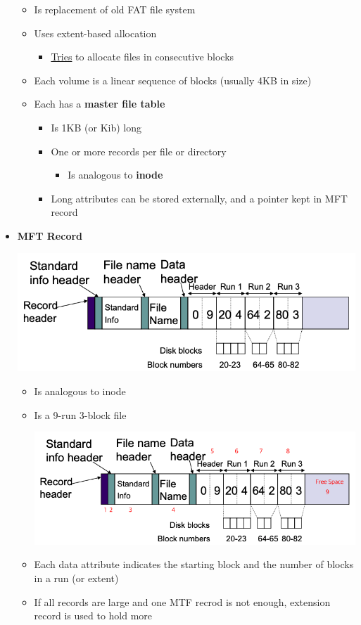 \documentclass[12pt]{article}
\begin{document}
\begin{itemize}
    \begin{itemize}
        \item Is replacement of old FAT file system
        \item Uses extent-based allocation
        \begin{itemize}
            \item \underline{Tries} to allocate files in consecutive blocks
        \end{itemize}
        \item Each volume is a linear sequence of blocks (usually 4KB in size)
        \item Each has a \textbf{master file table}
        \begin{itemize}
            \item Is 1KB (or Kib) long
            \item One or more records per file or directory
            \begin{itemize}
                \item Is analogous to \textbf{inode}
            \end{itemize}
            \item Long attributes can be stored externally, and a pointer kept in MFT record
        \end{itemize}
    \end{itemize}

    \item \textbf{MFT Record}

    \begin{center}
        \includegraphics[width=0.6\linewidth]{images/notes_10.png}
    \end{center}

    \begin{itemize}
        \item Is analogous to inode
        \item Is a 9-run 3-block file
        \begin{center}
            \includegraphics[width=0.6\linewidth]{images/notes_11.png}
        \end{center}
        \item Each data attribute indicates the starting block and the number of blocks in a run (or extent)
        \item If all records are large and one MTF recrod is not enough, extension record is used to hold more


\end{itemize}
\end{itemize}
\end{document}
